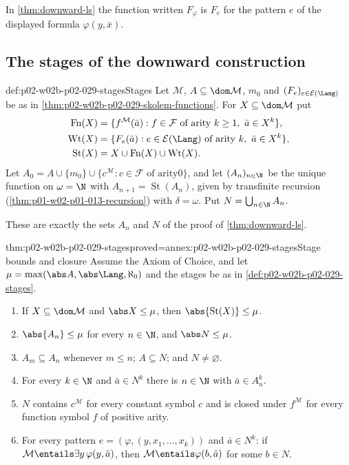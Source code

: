 In \cref{thm:downward-ls} the function written \(F_\varphi\) is \(F_e\) for
the pattern \(e\) of the displayed formula \(\varphi(y,\bar x)\).

\subsection{The stages of the downward construction}
\label{sec:p02-w02b-p02-029-stage-bounds}

\begin{hbdefinition}{def:p02-w02b-p02-029-stages}{Stages}
Let \(\mathcal M\), \(A\subseteq\dom\mathcal M\), \(m_0\) and
\((F_e)_{e\in\mathcal E(\Lang)}\) be as in
\cref{thm:p02-w02b-p02-029-skolem-functions}. For
\(X\subseteq\dom\mathcal M\) put
\[
\begin{aligned}
  \operatorname{Fn}(X)&=\{f^{\mathcal M}(\bar a):f\in\mathcal F
      \text{ of arity }k\geq1,\ \bar a\in X^k\},\\
  \operatorname{Wt}(X)&=\{F_e(\bar a):e\in\mathcal E(\Lang)
      \text{ of arity }k,\ \bar a\in X^k\},\\
  \operatorname{St}(X)&=X\cup\operatorname{Fn}(X)\cup\operatorname{Wt}(X).
\end{aligned}
\]
Let \(A_0=A\cup\{m_0\}\cup\{c^{\mathcal M}:c\in\mathcal F\text{ of arity
}0\}\), and let \((A_n)_{n\in\N}\) be the unique function on \(\omega=\N\)
with \(A_{n+1}=\operatorname{St}(A_n)\), given by transfinite recursion
(\cref{thm:p01-w02-p01-013-recursion}) with \(\delta=\omega\). Put
\(N=\bigcup_{n\in\N}A_n\).
\end{hbdefinition}

These are exactly the sets \(A_n\) and \(N\) of the proof of
\cref{thm:downward-ls}.

\begin{hbtheorem}{thm:p02-w02b-p02-029-stages}{proved=annex:p02-w02b-p02-029-stages}{Stage bounds and closure}
Assume the Axiom of Choice, and let
\(\mu=\max(\abs A,\abs\Lang,\aleph_0)\) and the stages be as in
\cref{def:p02-w02b-p02-029-stages}.
\begin{enumerate}
  \item If \(X\subseteq\dom\mathcal M\) and \(\abs X\leq\mu\), then
        \(\abs{\operatorname{St}(X)}\leq\mu\).
  \item \(\abs{A_n}\leq\mu\) for every \(n\in\N\), and
        \(\abs N\leq\mu\).
  \item \(A_m\subseteq A_n\) whenever \(m\leq n\); \(A\subseteq N\); and
        \(N\neq\varnothing\).
  \item For every \(k\in\N\) and \(\bar a\in N^k\) there is \(n\in\N\)
        with \(\bar a\in A_n^k\).
  \item \(N\) contains \(c^{\mathcal M}\) for every constant symbol \(c\) and
        is closed under \(f^{\mathcal M}\) for every function symbol \(f\) of
        positive arity.
  \item For every pattern \(e=(\varphi,(y,x_1,\ldots,x_k))\) and
        \(\bar a\in N^k\): if
        \(\mathcal M\entails\exists y\,\varphi(y,\bar a)\), then
        \(\mathcal M\entails\varphi(b,\bar a)\) for some \(b\in N\).
\end{enumerate}
\end{hbtheorem}

